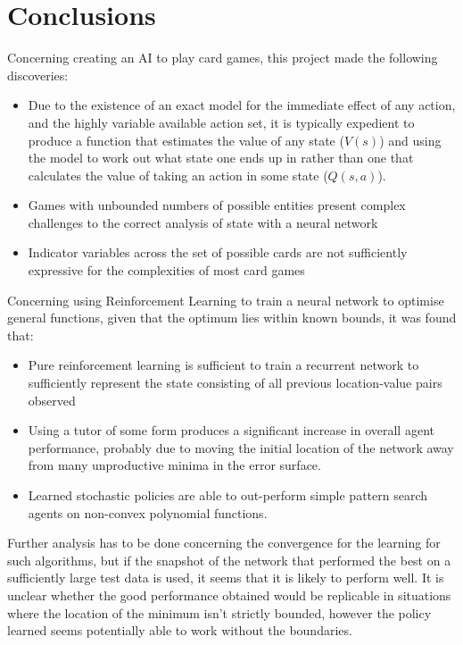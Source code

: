 \section{Conclusions}
Concerning creating an AI to play card games, this project made the following discoveries:
\begin{itemize}
\item Due to the existence of an exact model for the immediate effect of any action, and the highly variable available action set, it is typically expedient to produce a function that estimates the value of any state ($V(s)$) and using the model to work out what state one ends up in rather than one that calculates the value of taking an action in some state ($Q(s,a)$).
\item Games with unbounded numbers of possible entities present complex challenges to the correct analysis of state with a neural network 
\item Indicator variables across the set of possible cards are not sufficiently expressive for the complexities of most card games
\end{itemize}


Concerning using Reinforcement Learning to train a  neural network to optimise general functions, given that the optimum lies within known bounds, it was found that:
\begin{itemize}
\item Pure reinforcement learning is sufficient to train a recurrent network to sufficiently represent the state consisting of all previous location-value pairs observed
\item Using a tutor of some form produces a significant increase in overall agent performance, probably due to moving the initial location of the network away from many unproductive minima in the error surface.
\item Learned stochastic policies are able to out-perform simple pattern search agents on non-convex polynomial functions.
\end{itemize}
Further analysis has to be done concerning the convergence for the learning for such algorithms, but if the snapshot of the network that performed the best on a sufficiently large test data is used, it seems that it is likely to perform well. It is unclear whether the good performance obtained would be replicable in situations where the location of the minimum isn't strictly bounded, however the policy learned seems potentially able to work without the boundaries.

